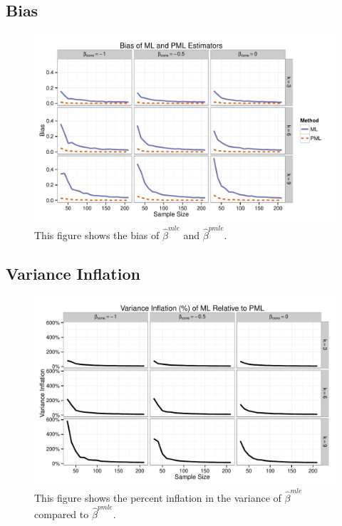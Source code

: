 \documentclass[12pt]{article}
\begin{document}
\begin{appendix}
\subsection{Bias}

\begin{figure}[H]
\begin{center}
\includegraphics[width = \textwidth]{figs/sims-bias.pdf}
\caption{This figure shows the bias of $\hat{\beta}^{mle}$ and $\hat{\beta}^{pmle}$.}\label{fig:bias}
\end{center}
\end{figure}

\subsection{Variance Inflation}

\begin{figure}[H]
\begin{center}
\includegraphics[width = \textwidth]{figs/sims-var-infl.pdf}
\caption{This figure shows the percent inflation in the variance of $\hat{\beta}^{mle}$ compared to $\hat{\beta}^{pmle}$.}\label{fig:var-infl}
\end{center}
\end{figure}


\end{appendix}
\end{document}
